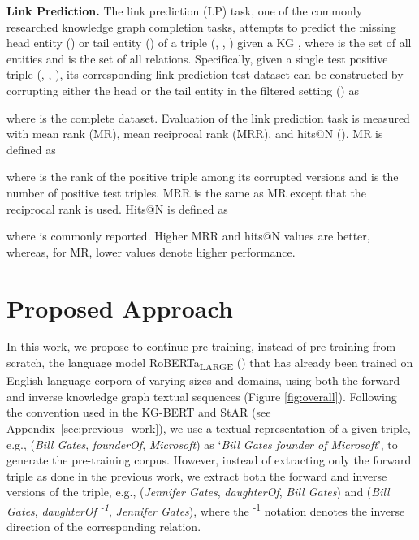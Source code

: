 \documentclass[11pt]{article}
\begin{document}
\textbf{Link Prediction.} The link prediction (LP) task, one of the commonly researched knowledge graph completion tasks, attempts to predict the missing head entity () or tail entity () of a triple (, , ) given a KG , where  is the set of all entities and  is the set of all relations. Specifically, given a single test positive triple (, , ), its corresponding link prediction test dataset can be constructed by corrupting either the head or the tail entity in the filtered setting (\citealp{bordes2013translating}) as





where  is the complete dataset. Evaluation of the link prediction task is measured with mean rank (MR), mean reciprocal rank (MRR), and hits@N (\citealp{rossi2021knowledge}). MR is defined as



where  is the rank of the positive triple among its corrupted versions and  is the number of positive test triples. MRR is the same as MR except that the reciprocal rank  is used. Hits@N is defined as 



where  is commonly reported. Higher MRR and hits@N values are better, whereas, for MR, lower values denote higher performance.

\section{Proposed Approach}
In this work, we propose to continue pre-training, instead of pre-training from scratch, the language model RoBERTa\textsubscript{LARGE} (\citealp{liu2019roberta}) that has already been trained on English-language corpora of varying sizes and domains, using both the forward and inverse knowledge graph textual sequences (Figure \ref{fig:overall}). Following the convention used in the KG-BERT and StAR (see Appendix~\ref{sec:previous_work}), we use a textual representation of a given triple, e.g., (\emph{Bill Gates}, \emph{founderOf}, \emph{Microsoft}) as `\emph{Bill Gates founder of Microsoft}', to generate the pre-training corpus. However, instead of extracting only the forward triple as done in the previous work, we extract both the forward and inverse versions of the triple, e.g., (\emph{Jennifer Gates}, \emph{daughterOf}, \emph{Bill Gates}) and (\emph{Bill Gates}, \emph{daughterOf\textsuperscript{  -1}}, \emph{Jennifer Gates}), where the \textsuperscript{-1} notation denotes the inverse direction of the corresponding relation.
\end{document}
